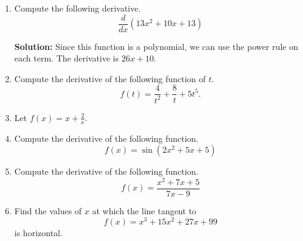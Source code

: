 \documentclass{article}
\begin{document}
\ActivityTitle[class=Calculus I, number=3, name=Differentiation I (Solutions)]

\begin{enumerate}
\item Compute the following derivative. \[ \frac{d}{dx} \left( 13 x^2 + 10 x + 13 \right) \]

\textbf{Solution:}
Since this function is a polynomial, we can use the power rule on each term. The derivative is $26 x + 10$.

  
\vspace{1cm}

\item Compute the derivative of the following function of $t$. \[ f(t) = \frac{4}{t^{2}} + \frac{8}{t} + 5 t^{5}. \]

  
\vspace{1cm}

\item Let $f(x) = x + \frac{2}{x}$.

  
\vspace{1cm}

\item Compute the derivative of the following function. \[ f(x) = \sin(2 x^2 + 5 x + 5) \]

  
\vspace{1cm}

\item Compute the derivative of the following function. \[ f(x) = \frac{x^2 + 7 x + 5}{7 x - 9} \]

  
\vspace{1cm}

\item Find the values of $x$ at which the line tangent to \[ f(x) = x^3 + 15 x^2 + 27 x + 99 \] is horizontal.

  
\vspace{1cm}
\end{enumerate}
\end{document}
